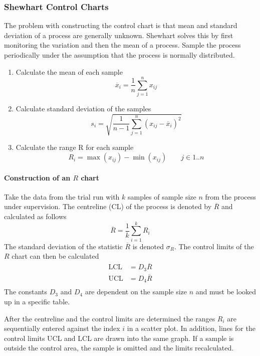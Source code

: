 \documentclass[11pt]{article}
\theoremstyle{definition}
\newcommand*\samplemean[1]{\overline{#1}}
\begin{document}
\subsubsection{Shewhart Control Charts}
The problem with constructing the control chart is that mean and standard deviation of a process are generally unknown. Shewhart solves this by first monitoring the variation and then the mean of a process. Sample the process periodically under the assumption that the process is normally distributed.
\begin{enumerate}
	\item Calculate the mean of each sample
	\begin{equation*}
		\samplemean{x}_i = \frac{1}{n}\sum_{j=1}^{n}x_{ij}
	\end{equation*}
	\item Calculate standard deviation of the samples
	\begin{equation*}
		s_i = \sqrt{\frac{1}{n-1} \sum_{j=1}^{n}(x_{ij}-\samplemean{x}_i)^2}
	\end{equation*}
	\item Calculate the range R for each sample
	\begin{equation*}
		R_i = \max(x_{ij}) - \min(x_{ij}) \qquad j\in1..n
	\end{equation*}
\end{enumerate}

\paragraph{Construction of an $R$ chart} Take the data from the trial run with $k$ samples of sample size $n$ from the process under supervision. The centreline (CL) of the process is denoted by $\samplemean{R}$ and calculated as follows
\begin{equation*}
	\samplemean{R} = \frac{1}{k}\sum_{i=1}^{k}R_i
\end{equation*}
The standard deviation of the statistic $\samplemean{R}$ is denoted $\sigma_R$. The control limits of the $R$ chart can then be calculated
\begin{align}
	\text{LCL} &= D_3\samplemean{R}\\
	\text{UCL} &= D_4\samplemean{R}\\
\end{align}
The constants $D_3$ and $D_4$ are dependent on the sample size $n$ and must be looked up in a specific table.

After the centreline and the control limits are determined the ranges $R_i$ are sequentially entered against the index $i$ in a scatter plot. In addition, lines for the control limits UCL and LCL are drawn into the same graph. If a sample is outside the control area, the sample is omitted and the limits recalculated.
\end{document}
